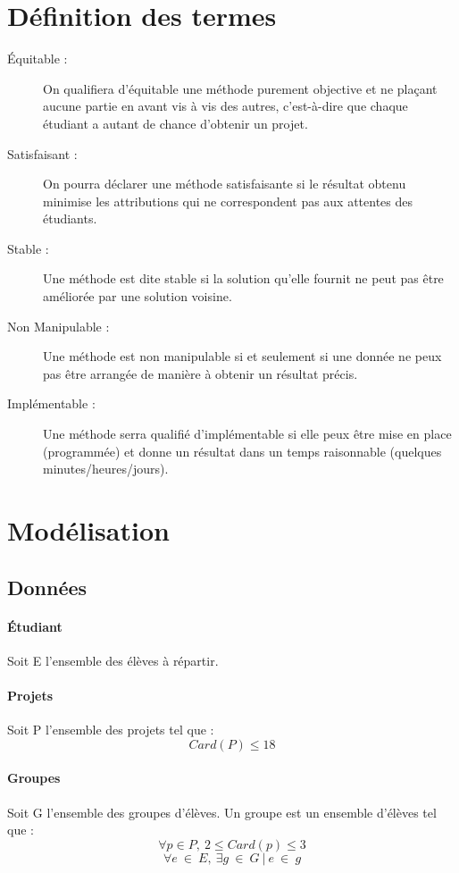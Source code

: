 \documentclass[10pt,a4paper]{article}
\begin{document}
\section{Définition des termes}
\begin{description}
\item[Équitable :]
On qualifiera d'équitable une méthode purement objective et ne plaçant aucune partie en avant vis à vis des autres, c'est-à-dire que chaque étudiant a autant de chance d'obtenir un projet.
\item[Satisfaisant :]
On pourra déclarer une méthode satisfaisante si le résultat obtenu minimise les attributions qui ne correspondent pas aux attentes des étudiants.
\item[Stable :]
Une méthode est dite stable si la solution qu'elle fournit ne peut pas être améliorée par une solution voisine.
\item[Non Manipulable :]
Une méthode est non manipulable si et seulement si une donnée ne peux pas être arrangée de manière à obtenir un résultat précis.
\item[Implémentable :]
Une méthode serra qualifié d'implémentable si elle peux être mise en place (programmée) et donne un résultat dans un temps raisonnable (quelques minutes/heures/jours).
\end{description}
\section{Modélisation}
\subsection{Données}
\paragraph{Étudiant}Soit E l'ensemble des élèves à répartir.
\paragraph{Projets}Soit P l'ensemble des projets tel que :
$$Card(P)\leqslant 18$$

\paragraph{Groupes}Soit G l'ensemble des groupes d'élèves. Un groupe est un ensemble d'élèves tel que :
$$\forall p \in P,\ 2\leqslant Card(p)\leqslant 3$$
$$\forall e\ \in \ E,\ \exists g \ \in \ G \ | \ e \ \in \ g$$ 
\end{document}
